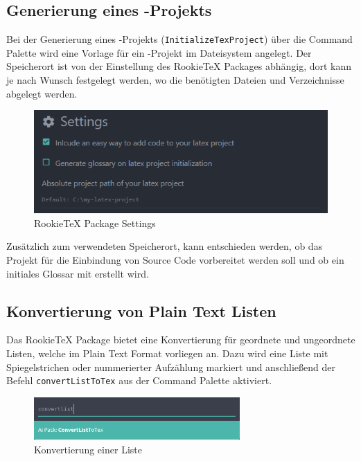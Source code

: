         \subsection{Generierung eines \latex-Projekts}
            Bei der Generierung eines \latex-Projekts (\texttt{InitializeTexProject}) über die Command Palette wird eine Vorlage für ein \latex-Projekt im Dateisystem angelegt. Der Speicherort ist von der Einstellung des RookieTeX Packages abhängig, dort kann je nach Wunsch festgelegt werden, wo die benötigten Dateien und Verzeichnisse abgelegt werden.
            \begin{figure}[H]
                \centering
                \includegraphics[width=\textwidth]{img/package_settings.png}
                \caption{RookieTeX Package Settings}
            \end{figure}
            Zusätzlich zum verwendeten Speicherort, kann entschieden werden, ob das Projekt für die Einbindung von Source Code vorbereitet werden soll und ob ein initiales Glossar mit erstellt wird.

        \subsection{Konvertierung von Plain Text Listen}
            Das RookieTeX Package bietet eine Konvertierung für geordnete und ungeordnete Listen, welche im Plain Text Format vorliegen an. Dazu wird eine Liste mit Spiegelstrichen oder nummerierter Aufzählung markiert und anschließend der Befehl \texttt{convertListToTex} aus der Command Palette aktiviert.
            \\[5mm]
            \begin{figure}[H]
                \centering
                \includegraphics[width=0.7\textwidth]{img/convert_list_cp.png}
                \caption{Konvertierung einer Liste}
            \end{figure}

